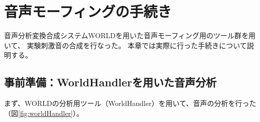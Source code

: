 \chapter{音声モーフィングの手続き}
\label{sec:MorphingAppendix}
音声分析変換合成システムWORLD\cite{morise2016world}を用いた音声モーフィング用のツール群\cite{kawahara2024interactive,kawahara2024WORLDGUI}を用いて、
実験刺激音の合成を行なった。
本章では実際に行った手続きについて説明する。

\section{事前準備：WorldHandlerを用いた音声分析}
\label{sec:WORLDHandler}
まず、WORLDの分析用ツール（WorldHandler）を用いて、音声の分析を行った（図\ref{fig:worldHandler}）。









